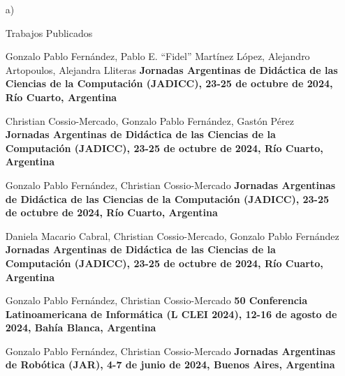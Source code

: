 \begin{enumerate}[leftmargin=0.8cm]

  \item[a)]{Trabajos Publicados
    \begin{itemize}[leftmargin=0.2cm]

      {Gonzalo Pablo Fernández, Pablo E. ``Fidel'' Martínez López, Alejandro Artopoulos, Alejandra Lliteras}
      {\textbf{Jornadas Argentinas de Didáctica de las Ciencias de la Computación (JADICC), 23-25 de octubre de 2024, Río Cuarto, Argentina}}

      {Christian Cossio-Mercado, Gonzalo Pablo Fernández, Gastón Pérez}
      {\textbf{Jornadas Argentinas de Didáctica de las Ciencias de la Computación (JADICC), 23-25 de octubre de 2024, Río Cuarto, Argentina}}

      {Gonzalo Pablo Fernández, Christian Cossio-Mercado}
      {\textbf{Jornadas Argentinas de Didáctica de las Ciencias de la Computación (JADICC), 23-25 de octubre de 2024, Río Cuarto, Argentina}}

      {Daniela Macario Cabral, Christian Cossio-Mercado, Gonzalo Pablo Fernández}
      {\textbf{Jornadas Argentinas de Didáctica de las Ciencias de la Computación (JADICC), 23-25 de octubre de 2024, Río Cuarto, Argentina}}

      {Gonzalo Pablo Fernández, Christian Cossio-Mercado}
      {\textbf{50 Conferencia Latinoamericana de Informática (L CLEI 2024), 12-16 de agosto de 2024, Bahía
      Blanca, Argentina}}

      {Gonzalo Pablo Fernández, Christian Cossio-Mercado}
      {\textbf{Jornadas Argentinas de Robótica (JAR), 4-7 de junio de 2024, Buenos Aires, Argentina}}


\end{itemize}}
\end{enumerate}
